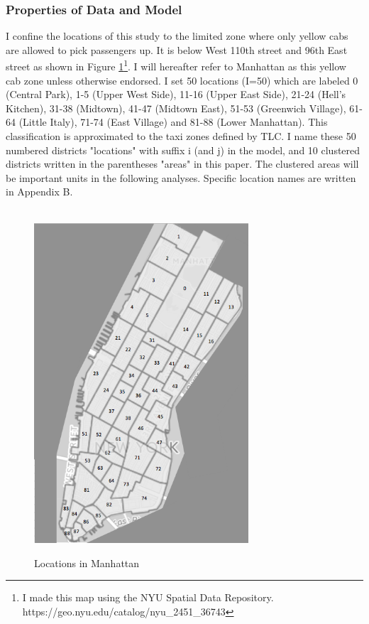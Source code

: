 \subsubsection{Properties of Data and Model}
\hspace{0.5cm} I confine the locations of this study to the limited zone where only yellow cabs are allowed to pick passengers up. It is below West 110th street and 96th East street as shown in Figure \ref{fig:Manhattan}\footnote{I made this map using the NYU Spatial Data Repository. https://geo.nyu.edu/catalog/nyu\_2451\_36743}. I will hereafter refer to Manhattan as this yellow cab zone unless otherwise endorsed. I set 50 locations (I=50) which are labeled 0 (Central Park), 1-5 (Upper West Side), 11-16 (Upper East Side), 21-24 (Hell's Kitchen), 31-38 (Midtown), 41-47 (Midtown East), 51-53 (Greenwich Village), 61-64 (Little Italy), 71-74 (East Village) and 81-88 (Lower Manhattan). This classification is approximated to the taxi zones defined by TLC. I name these 50 numbered districts "locations" with suffix i (and j) in the model, and 10 clustered districts written in the parentheses "areas" in this paper. The clustered areas will be important units in the following analyses. Specific location names are written in Appendix B.


\begin{figure}[h]
\centering
\caption{Locations in Manhattan}\label{fig:Manhattan}\\
\vspace{0.2cm}
\includegraphics[width=8cm]{Figures/Manhattan.png}
\end{figure}

